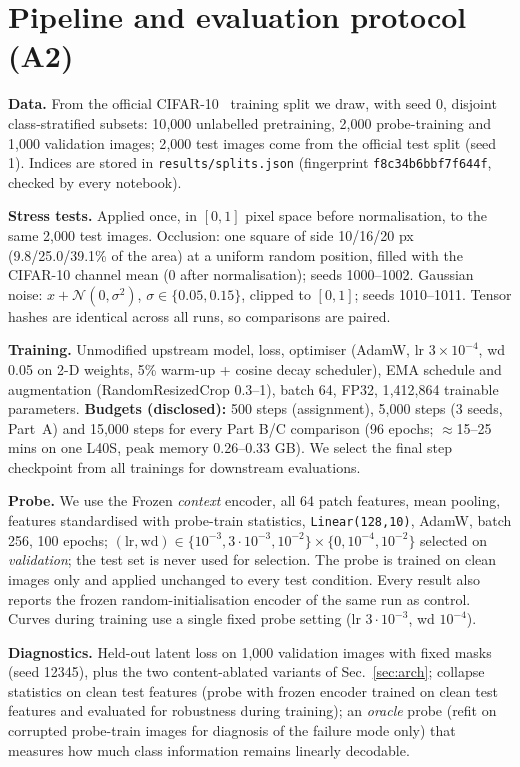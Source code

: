 \documentclass[10pt]{article}
\begin{document}
\section{Pipeline and evaluation protocol (A2)}
\label{sec:pipeline}
\textbf{Data.} From the official CIFAR-10~\cite{krizhevsky2009cifar} training split we draw, with seed 0, disjoint
class-stratified subsets: 10{,}000 unlabelled pretraining, 2{,}000 probe-training and 1{,}000 validation images; 2{,}000
test images come from the official test split (seed 1). Indices are stored in \texttt{results/splits.json}
(fingerprint \texttt{f8c34b6bbf7f644f}, checked by every notebook).

\textbf{Stress tests.} Applied once, in $[0,1]$ pixel space before normalisation, to the same 2{,}000 test images.
Occlusion: one square of side 10/16/20 px (9.8/25.0/39.1\% of the area) at a uniform random position, filled with the
CIFAR-10 channel mean (0 after normalisation); seeds 1000--1002. Gaussian noise: $x+\mathcal N(0,\sigma^2)$, $\sigma\in\{0.05,0.15\}$,
clipped to $[0,1]$; seeds 1010--1011. Tensor hashes are identical across all runs, so comparisons are paired.

\textbf{Training.} Unmodified upstream model, loss, optimiser (AdamW, lr $3{\times}10^{-4}$, wd 0.05 on 2-D weights, 5\%
warm-up + cosine decay scheduler), EMA schedule and augmentation (RandomResizedCrop 0.3--1), batch 64, FP32, 1{,}412{,}864 trainable
parameters. \textbf{Budgets (disclosed):} 500 steps (assignment), 5{,}000 steps (3 seeds, Part~A) and 15{,}000 steps for
every Part B/C comparison (96 epochs; $\approx$15--25 mins on one L40S, peak memory 0.26--0.33 GB). We select the final step checkpoint from all trainings for downstream evaluations.

\textbf{Probe.} We use the Frozen \emph{context} encoder, all 64 patch features, mean pooling, features standardised with probe-train
statistics, \texttt{Linear(128,10)}, AdamW, batch 256, 100 epochs; $(\mathrm{lr},\mathrm{wd})\in\{10^{-3},3{\cdot}10^{-3},10^{-2}\}\times\{0,10^{-4},10^{-2}\}$
selected on \emph{validation}; the test set is never used for selection. The probe is trained on clean images only and
applied unchanged to every test condition. Every result also reports the frozen random-initialisation encoder of the same
run as control. Curves during training use a single fixed probe setting (lr $3{\cdot}10^{-3}$, wd $10^{-4}$).

\textbf{Diagnostics.} Held-out latent loss on 1{,}000 validation images with fixed masks (seed 12345), plus the two
content-ablated variants of Sec.~\ref{sec:arch}; collapse statistics on clean test features (probe with frozen encoder trained on clean test features and evaluated for robustness during training); an \emph{oracle} probe (refit on
corrupted probe-train images for diagnosis of the failure mode only) that measures how much class information remains linearly decodable.
\end{document}
